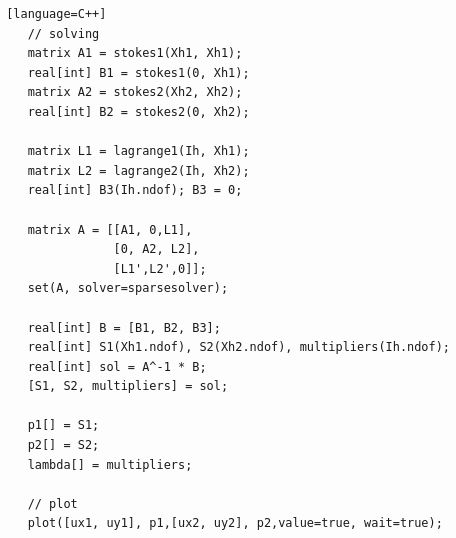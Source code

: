 \documentclass{article}
\begin{document}
\begin{lstlisting} [language=C++]
	// solving
	matrix A1 = stokes1(Xh1, Xh1);
	real[int] B1 = stokes1(0, Xh1);
	matrix A2 = stokes2(Xh2, Xh2);
	real[int] B2 = stokes2(0, Xh2);

	matrix L1 = lagrange1(Ih, Xh1);
	matrix L2 = lagrange2(Ih, Xh2);
	real[int] B3(Ih.ndof); B3 = 0;

	matrix A = [[A1, 0,L1],
		    	[0, A2, L2], 
		    	[L1',L2',0]];
	set(A, solver=sparsesolver);

	real[int] B = [B1, B2, B3];
	real[int] S1(Xh1.ndof), S2(Xh2.ndof), multipliers(Ih.ndof);
	real[int] sol = A^-1 * B;
	[S1, S2, multipliers] = sol;

	p1[] = S1;
	p2[] = S2;
	lambda[] = multipliers;

	// plot
	plot([ux1, uy1], p1,[ux2, uy2], p2,value=true, wait=true);
\end{lstlisting}



\end{document}
